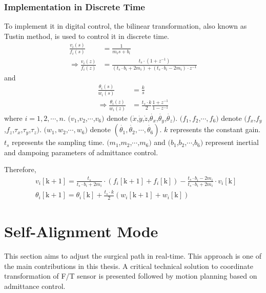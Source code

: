 \subsubsection{Implementation in Discrete Time}
\hspace*{6mm}To implement it in digital control, the bilinear transformation, also known as Tustin method, is used to control it in discrete time.
\begin{equation}
\label{eq:z_domain eq}
\begin{split}
\frac{v_i(s)}{f_i(s)} &= \frac{1}{m_is+b_i}\\
\Rightarrow 
\frac{v_i(z)}{f_i(z)} &= \frac{t_s \cdot (1+z^{-1})}{(t_s \cdot b_i+2m_i)+(t_s \cdot b_i-2m_i)\cdot z^{-1}}
\end{split}
\end{equation}
and
\begin{equation}
\begin{split}
\frac{\theta_i(s)}{w_i(s)}
				&= \frac{k}{s}\\
\Rightarrow 
\frac{\theta_i(z)}{w_i(z)}
				&= \frac{t_s \cdot k}{2}	
					\frac{1+z^{-1}}{1-z^{-1}}
\end{split}
\end{equation}
where $i = 1,2,\cdots, n$. $(v_1$,$v_2$,$\cdots$,$v_6)$ denote $(\dot{x}$,$\dot{y}$,$\dot{z}$,$\dot{\theta _x}$,$\dot{\theta _y}$,$\dot{\theta _z})$. $(f_1,f_2$,$\cdots,f_6)$ denote $(f_x$,$f_y$,$f_z$,$\tau _x$,$\tau _y$,$\tau _z )$. $(w_1,w_2$,$\cdots,w_6)$ denote $(\dot{\theta _1}, \dot{\theta _2} ,\cdots , \dot{\theta _6} )$. $k$ represents the constant gain. $t_s$ represents the sampling time. $(m_1$,$m_2$,$\cdots$,$m_6)$ and $(b_1$,$b_2$,$\cdots$,$b_6)$ represent inertial and dampoing parameters of admittance control.
\par\noindent
Therefore,
\begin{equation}
\begin{split}
&v_i[\mathrm{k}+1] = \frac{t_s}{t_s \cdot b_i+2m_i}
							\cdot \left(	f_i[\mathrm{k}+1] + f_i[\mathrm{k}]		\right)
						 - \frac{t_s \cdot b_i-2m_i}{t_s \cdot b_i+2m_i}
						 	\cdot v_i[\mathrm{k}]												\\
&\theta_i[\mathrm{k}+1] = \theta_i[\mathrm{k}] + \frac{t_s \cdot k}{2}
												\left( w_i[\mathrm{k}+1] + w_i[\mathrm{k}] \right)
\end{split}
\end{equation}	
\section{Self-Alignment Mode}
\hspace*{6mm}This section aims to adjust the surgical path in real-time. This approach is one of the main contributions in this thesis. A critical technical solution to coordinate transformation of F/T sensor is presented followed by motion planning based on admittance control. 
